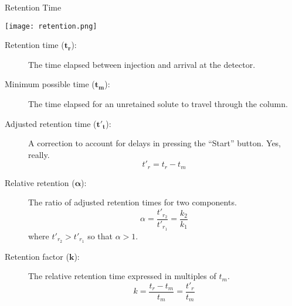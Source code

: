 \documentclass[notes=only]{beamer}
\begin{document}
\begin{frame}[allowframebreaks=1]{Retention Time}
	\begin{center}
		\texttt{[image: retention.png]}
	\end{center}

	\begin{description}
		\item[Retention time ($\bm{t_r}$):] The time
			elapsed between injection and arrival at the
			detector.
		\item[Minimum possible time ($\bm{t_m}$):] The
			time elapsed for an \alert{unretained} solute to
			travel through the column.
		\item[Adjusted retention time ($\bm{t'_t}$):] A
			correction to account for delays in pressing the
			``Start'' button. Yes, really.
			\begin{equation*}
				t'_r = t_r - t_m
			\end{equation*}
		\item[Relative retention ($\bm{\alpha}$):] The ratio of
			\alert{adjusted} retention times for two components.
			\begin{equation*}
				\alpha = \frac{t'_{r_2}}{t'_{r_1}} =
				\frac{k_2}{k_1}
			\end{equation*}
			where $t'_{r_2} > t'_{r_1}$ so that $\alpha > 1$.
		\item[Retention factor ($\bm{k}$):] The relative
			retention time expressed in multiples of $t_m$.
			\begin{equation*}
				k = \frac{t_r - t_m}{t_m} = \frac{t'_r}{t_m}
			\end{equation*}
	\end{description}
\end{frame}
\end{document}
